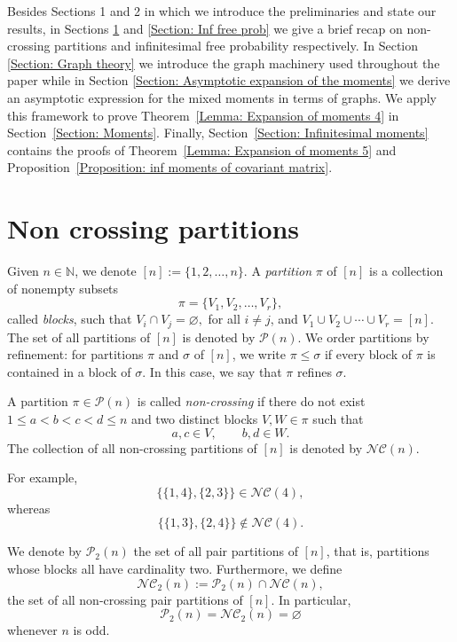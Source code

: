 \documentclass{article}
\theoremstyle{definition}
\newcommand{\cP}{\mathcal{P}}
\newcommand{\NC}{\mathcal{NC}}
\begin{document}

Besides Sections 1 and 2 in which we introduce the preliminaries and state our results, in Sections \ref{Section: Non crossing partitions} and \ref{Section: Inf free prob} we give a brief recap on non-crossing partitions and infinitesimal free probability respectively. In Section \ref{Section: Graph theory} we introduce the graph machinery used throughout the paper while in Section \ref{Section: Asymptotic expansion of the moments} we derive an asymptotic expression for the mixed moments in terms of graphs. We apply this framework to prove
Theorem~\ref{Lemma: Expansion of moments 4}
in Section~\ref{Section: Moments}.
Finally, Section~\ref{Section: Infinitesimal moments}
contains the proofs of
Theorem~\ref{Lemma: Expansion of moments 5}
and Proposition~\ref{Proposition: inf moments of covariant matrix}.

\section{Non crossing partitions}\label{Section: Non crossing partitions}

Given \(n\in\mathbb N\), we denote
$
[n]:=\{1,2,\ldots,n\}.
$
A \emph{partition} \(\pi\) of \([n]\) is a collection of nonempty subsets
\[
\pi=\{V_1,V_2,\ldots,V_r\},
\]
called \emph{blocks}, such that
$
V_i\cap V_j=\varnothing,$ for all $i\neq j$, and 
$
V_1\cup V_2\cup\cdots\cup V_r=[n].
$
The set of all partitions of \([n]\) is denoted by \(\cP(n)\).
We order partitions by refinement: for partitions $\pi$ and
$\sigma$ of $[n]$, we write $\pi\leq\sigma$ if every block
of $\pi$ is contained in a block of $\sigma$.
In this case, we say that $\pi$ refines $\sigma$.

A partition \(\pi\in \cP(n)\) is called \emph{non-crossing} if there do not exist
\(1\le a<b<c<d\le n\) and two distinct blocks \(V,W\in\pi\) such that
\[
a,c\in V,
\qquad
b,d\in W.
\]
The collection of all non-crossing partitions of \([n]\) is denoted by
$\NC(n).$

For example,
\[
\{\{1,4\},\{2,3\}\}\in \NC(4),
\]
whereas
\[
\{\{1,3\},\{2,4\}\}\notin \NC(4).
\]

We denote by \(\cP_2(n)\) the set of all pair partitions of \([n]\), that is, partitions whose blocks all have cardinality two. Furthermore, we define
\[
\NC_2(n):=\cP_2(n)\cap \NC(n),
\]
the set of all non-crossing pair partitions of \([n]\).
In particular,
\[
\cP_2(n)=\NC_2(n)=\varnothing
\]
whenever \(n\) is odd.

\end{document}

